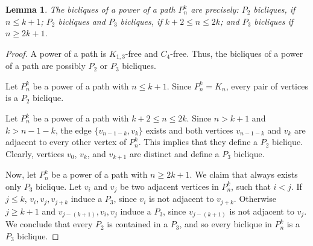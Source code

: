 \documentclass{article}
\newtheorem{lemma}[theorem]{Lemma}
\begin{document}
\begin{lemma}
\label{lem:powerofpathsbicliques}
 The bicliques of a power of a path $P_n^k$ are precisely: 
 $P_{2}$ bicliques, if $n \leq k + 1$;
 $P_{2}$ bicliques and $P_{3}$ bicliques, if $k + 2 \leq n \leq 2k$; and
 $P_{3}$ bicliques if $n \geq 2k + 1$.
\end{lemma}
\begin{proof}
A power of a path is $K_{1, 3}$-free and $C_4$-free. Thus, the bicliques of a
power of a path are possibly $P_{2}$ or $P_{3}$ bicliques. 

Let $P_{n}^{k}$ be a power of a path with $n
\leq k + 1$. Since $P_n^k = K_n$, every pair of vertices is a $P_2$ biclique.

Let $P_{n}^{k}$ be a power of a path with $k + 2 \leq n \leq
2k$. Since $n > k + 1$ and $k > n - 1 - k$, the edge $\{v_{n-1-k}, v_k\}$ exists
and both vertices $v_{n-1-k}$ and $v_k$ are adjacent to every other vertex of
$P_n^k$. This implies that they define a $P_2$ biclique. Clearly, vertices
$v_0$, $v_k$, and $v_{k+1}$ are distinct and define a $P_3$ biclique.

Now, let $P_{n}^{k}$ be a power of a path with $n \geq
2k + 1$. We claim that always exists only $P_{3}$ biclique. Let $v_{i}$ and
$v_{j}$ be two adjacent vertices in $P_{n}^{k}$, such that $i < j$. If $j \leq
k$, $v_{i}, v_{j}, v_{j + k}$ induce a $P_{3}$, since $v_{i}$ is not adjacent
to $v_{j + k}$. Otherwise $j \geq k + 1$ and $v_{j - (k + 1)}, v_{i}, v_{j}$
induce a $P_{3}$, since $v_{j - (k + 1)}$ is not adjacent to $v_{j}$. We
conclude that every $P_{2}$ is contained in a $P_{3}$, and so every biclique in
$P_{n}^{k}$ is a $P_{3}$ biclique.
\end{proof}
\end{document}
